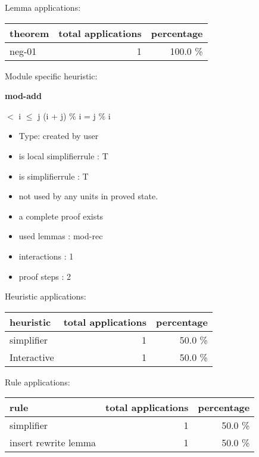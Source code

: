 \documentclass[a4paper]{article}
\begin{document}
Lemma applications:

\begin{supertabular}{l|r|r}
theorem	        & total applications & percentage \\ \hline
neg-01 & 1 & 100.0 \% \\

\end{supertabular}

Module specific heuristic:

\pagebreak

{\LARGE\bf mod-add}\label{lemma-mod-add}

\medskip

  $<$ i  $\le$ j \Imp (i + j) \% i = j \% i

\begin{itemize}

\item Type: created by user

\item is local simplifierrule : T
\item is simplifierrule : T
\item not used by any units in proved state.
\item       a complete proof exists
\item       used lemmas  : mod-rec
\item       interactions : 1
\item       proof steps  : 2
\end{itemize}

\medskip


Heuristic applications:

\begin{supertabular}{l|r|r}
heuristic	& total applications & percentage \\ \hline
simplifier & 1 & 50.0 \% \\
Interactive & 1 & 50.0 \% \\

\end{supertabular}

Rule applications:

\begin{supertabular}{l|r|r}
rule	        & total applications & percentage \\ \hline
simplifier & 1 & 50.0 \% \\
insert rewrite lemma & 1 & 50.0 \% \\

\end{supertabular}
\end{document}
